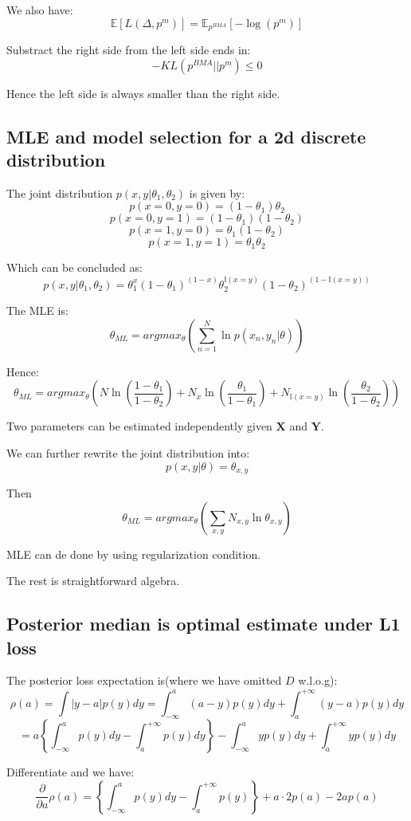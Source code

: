 \documentclass[UTF8]{ctexart}
\begin{document}
We also have:
$$\mathbb{E}[L(\Delta,p^{m})]=\mathbb{E}_{p^{BMA}}[-\log(p^{m})]$$

Substract the right side from the left side ends in:
$$-KL(p^{BMA}||p^{m}) \leq 0$$

Hence the left side is always smaller than the right side.

\subsection{MLE and model selection for a 2d discrete distribution}
The joint distribution $p(x,y|\theta_{1},\theta_{2})$ is given by:
$$p(x=0,y=0)=(1-\theta_{1})\theta_{2}$$
$$p(x=0,y=1)=(1-\theta_{1})(1-\theta_{2})$$
$$p(x=1,y=0)=\theta_{1}(1-\theta_{2})$$
$$p(x=1,y=1)=\theta_{1}\theta_{2}$$

Which can be concluded as:
$$p(x,y|\theta_{1},\theta_{2})=\theta_{1}^{x}(1-\theta_{1})^{(1-x)}\theta_{2}^{\mathbb{I}(x=y)}(1-\theta_{2})^{(1-\mathbb{I}(x=y))}$$

The MLE is:
$$\theta_{ML}=argmax_{\theta}(\sum_{n=1}^{N}\ln p(x_{n},y_{n}|\theta))$$

Hence:
$$\theta_{ML}=argmax_{\theta}(N\ln(\frac{1-\theta_{1}}{1-\theta_{2}})+N_{x}\ln(\frac{\theta_{1}}{1-\theta_{1}}) + N_{\mathbb{I}(x=y)}\ln(\frac{\theta_{2}}{1-\theta_{2}}))$$

Two parameters can be estimated independently given $\textbf{X}$ and $\textbf{Y}$.

We can further rewrite the joint distribution into:
$$p(x,y|\theta)=\theta_{x,y}$$

Then
$$\theta_{ML}=argmax_{\theta}(\sum_{x,y}N_{x,y}\ln \theta_{x,y})$$

MLE can de done by using regularization condition.

The rest is straightforward algebra.

\subsection{Posterior median is optimal estimate under L1 loss}
The posterior loss expectation is(where we have omitted $D$ w.l.o.g):
$$\rho(a) = \int |y-a|p(y)dy = \int_{-\infty}^{a}(a-y)p(y)dy + \int_{a}^{+\infty}(y-a)p(y)dy$$
$$=a\left\{\int_{-\infty}^{a}p(y)dy - \int_{a}^{+\infty}p(y)dy  \right\} -\int_{-\infty}^{a}yp(y)dy + \int_{a}^{+\infty}yp(y)dy$$

Differentiate and we have:
$$\frac{\partial}{\partial a}\rho(a) = \left\{\int_{-\infty}^{a}p(y)dy - \int_{a}^{+\infty}p(y)  \right\} + a\cdot 2p(a) - 2a p(a)$$
\end{document}
